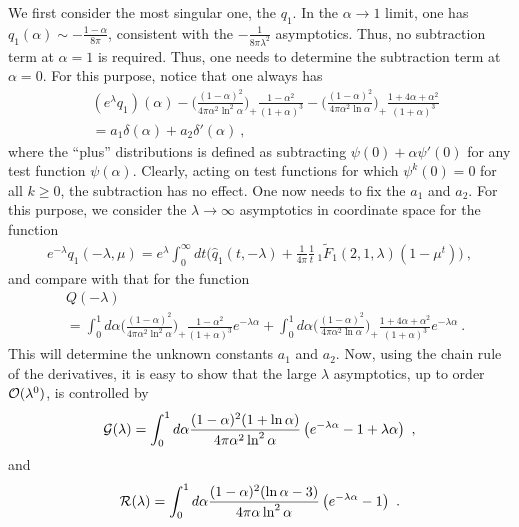 \documentclass[a4paper,11pt]{article}
\begin{document}
We first consider the most singular one, the $q_1$. In the $\alpha \rightarrow 1$ limit, one has $q_1(\alpha) \sim -\frac{1-\alpha}{8\pi}$, consistent with the $-\frac{1}{8\pi \lambda^2}$ asymptotics. Thus, no subtraction term at $\alpha=1$ is required. Thus, one needs to determine the subtraction term at $\alpha=0$. For this purpose, notice that one always has
\begin{align}
&(e^{\lambda}q_1)(\alpha)-\bigg(\frac{\left(1-\alpha\right)^2}{4\pi \alpha^2\ln ^2\alpha}\bigg)_{+}\frac{1-\alpha^2}{(1+\alpha)^3}-\bigg(\frac{(1-\alpha)^2}{4\pi \alpha^2 \ln \alpha}\bigg)_{+}\frac{1+4\alpha+\alpha^2}{(1+\alpha)^3}
\nonumber \\ 
&=a_1\delta(\alpha)+a_2\delta'(\alpha) \ ,
\end{align}
where the ``plus'' distributions is defined as subtracting $\psi(0)+\alpha \psi'(0)$ for any test function $\psi(\alpha)$.  Clearly, acting on test functions for which $\psi^{k}(0)=0$ for all $k\ge 0$, the subtraction has no effect. One now needs to fix the $a_1$ and $a_2$. For this purpose, we consider the $\lambda \rightarrow \infty$ asymptotics in coordinate space for the function
\begin{align}
e^{-\lambda}q_1(-\lambda,\mu)=e^{\lambda}\int_{0}^{\infty} dt \bigg(\hat q_1(t,-\lambda)+\frac{1}{4\pi}\frac{1}{t}\,_1\tilde F_1(2,1,\lambda)(1-\mu^t)\bigg) \ ,
\end{align}
and compare with that for the function
\begin{align}
&Q(-\lambda)\nonumber \\ 
&=\int_{0}^{1} d\alpha \bigg(\frac{\left(1-\alpha\right)^2}{4\pi \alpha^2\ln ^2\alpha}\bigg)_{+}\frac{1-\alpha^2}{(1+\alpha)^3}e^{-\lambda \alpha}+\int_{0}^{1} d\alpha \bigg(\frac{\left(1-\alpha\right)^2}{4\pi \alpha^2\ln \alpha}\bigg)_{+}\frac{1+4\alpha+\alpha^2}{(1+\alpha)^3}e^{-\lambda \alpha} \ . 
\end{align}
This will determine the unknown constants $a_1$ and $a_2$. Now, using the chain rule of the derivatives, it is easy to show that the large $\lambda$ asymptotics, up to order ${\cal O}(\lambda^0)$, is controlled by 
\begin{align}
{\cal G}(\lambda)=\int_{0}^{1} d\alpha \frac{(1-\alpha)^2(1+\ln \alpha)}{4\pi \alpha^2 \ln^2 \alpha}\left(e^{-\lambda \alpha}-1+\lambda \alpha\right) \ ,
\end{align}
and
\begin{align}
{\cal R}(\lambda)=\int_{0}^{1} d\alpha \frac{(1-\alpha)^2(\ln \alpha-3)}{4\pi \alpha \ln^2 \alpha}\left(e^{-\lambda \alpha}-1\right) \ .
\end{align}
\end{document}
